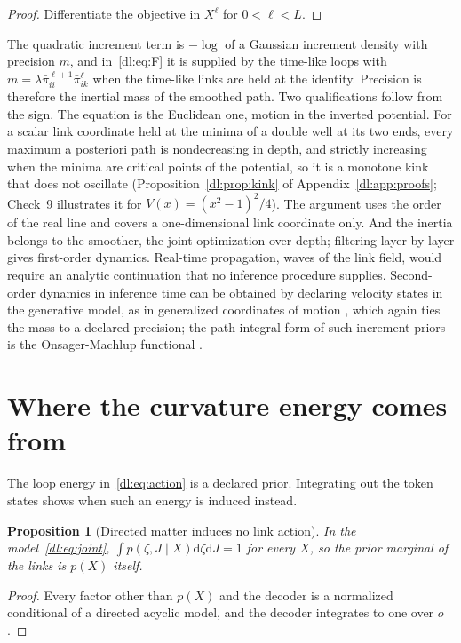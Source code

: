 \documentclass[11pt]{article}
\newtheorem{proposition}[theorem]{Proposition}
\theoremstyle{definition}
\theoremstyle{remark}
\begin{document}
\begin{proof}
Differentiate the objective in $X^\ell$ for $0<\ell<L$.
\end{proof}

The quadratic increment term is $-\log$ of a Gaussian increment density with precision $m$, and in~\eqref{dl:eq:F} it is supplied by the time-like loops with $m=\lambda\bar\pi_{ii}^{\ell+1}\bar\pi_{ik}^\ell$ when the time-like links are held at the identity. Precision is therefore the inertial mass of the smoothed path. Two qualifications follow from the sign. The equation is the Euclidean one, motion in the inverted potential. For a scalar link coordinate held at the minima of a double well at its two ends, every maximum a posteriori path is nondecreasing in depth, and strictly increasing when the minima are critical points of the potential, so it is a monotone kink that does not oscillate (Proposition~\ref{dl:prop:kink} of Appendix~\ref{dl:app:proofs}; Check~9 illustrates it for $V(x)=(x^2-1)^2/4$). The argument uses the order of the real line and covers a one-dimensional link coordinate only. And the inertia belongs to the smoother, the joint optimization over depth; filtering layer by layer gives first-order dynamics. Real-time propagation, waves of the link field, would require an analytic continuation that no inference procedure supplies. Second-order dynamics in inference time can be obtained by declaring velocity states in the generative model, as in generalized coordinates of motion \cite{dl:friston2008dem}, which again ties the mass to a declared precision; the path-integral form of such increment priors is the Onsager-Machlup functional \cite{dl:onsager1953}.

\section{Where the curvature energy comes from}
\label{dl:sec:induced}

The loop energy in~\eqref{dl:eq:action} is a declared prior. Integrating out the token states shows when such an energy is induced instead.

\begin{proposition}[Directed matter induces no link action]
\label{dl:prop:directed}
In the model~\eqref{dl:eq:joint}, $\int p(\zeta,J\mid X)\mathrm{d}\zeta\mathrm{d}J=1$ for every $X$, so the prior marginal of the links is $p(X)$ itself.
\end{proposition}

\begin{proof}
Every factor other than $p(X)$ and the decoder is a normalized conditional of a directed acyclic model, and the decoder integrates to one over $o$.
\end{proof}
\end{document}
